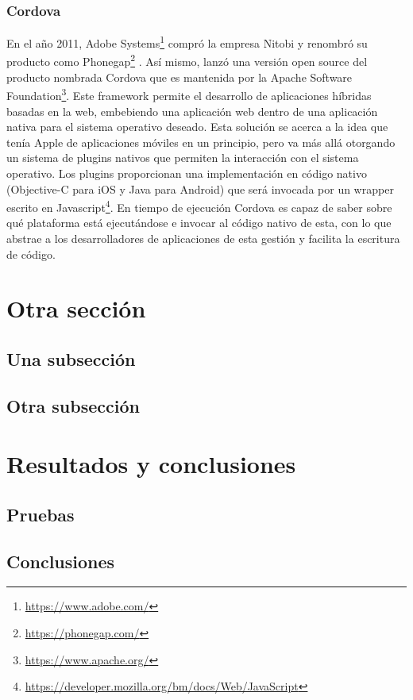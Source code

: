 \documentclass[a4paper, 12pt]{article}
\begin{document}
\subsubsection{Cordova}
\label{sec-2-1-3}
En el año 2011, Adobe Systems\footnote{\url{https://www.adobe.com/}} compró la empresa Nitobi y renombró su producto
como Phonegap\footnote{\url{https://phonegap.com/}} . Así mismo, lanzó una versión open source del producto nombrada
Cordova que es mantenida por la Apache Software Foundation\footnote{\url{https://www.apache.org/}}.
Este framework permite el desarrollo de aplicaciones híbridas basadas en la web,
embebiendo una aplicación web dentro de una aplicación nativa para el sistema
operativo deseado. Esta solución se acerca a la idea que tenía Apple de aplicaciones
móviles en un principio, pero va más allá otorgando un sistema de plugins nativos que
permiten la interacción con el sistema operativo.
Los plugins proporcionan una implementación en código nativo (Objective-C para iOS
y Java para Android) que será invocada por un wrapper escrito en Javascript\footnote{\url{https://developer.mozilla.org/bm/docs/Web/JavaScript}}. En
tiempo de ejecución Cordova es capaz de saber sobre qué plataforma está ejecutándose
e invocar al código nativo de esta, con lo que abstrae a los desarrolladores de
aplicaciones de esta gestión y facilita la escritura de código.
\section{Otra sección}
\label{sec-3}

\subsection{Una subsección}
\label{sec-3-1}

\subsection{Otra subsección}
\label{sec-3-2}

\section{Resultados y conclusiones}
\label{sec-4}

\subsection{Pruebas}
\label{sec-4-1}

\subsection{Conclusiones}
\label{sec-4-2}

\printbibliography[heading=bibnumbered] %
\end{document}
